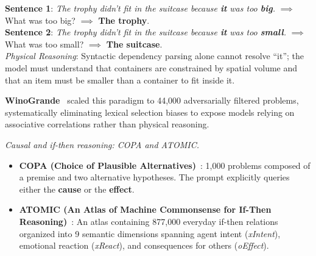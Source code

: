 \documentclass[../../main.tex]{subfiles}
\begin{document}
\begin{center}
\begin{minipage}{0.95\textwidth}
\begin{tcolorbox}[colback=cardBg,colframe=cardLine,arc=2pt,boxrule=0.5pt,title=\textbf{Task Example: Pronoun Coreference Ambiguity (WSC Twin Sentences)}]
\small\sffamily
\textbf{Sentence 1}: \textit{The trophy didn't fit in the suitcase because \textbf{it} was too \textbf{big}.} $\implies$ What was too big? $\implies$ \textbf{The trophy}. \\
\textbf{Sentence 2}: \textit{The trophy didn't fit in the suitcase because \textbf{it} was too \textbf{small}.} $\implies$ What was too small? $\implies$ \textbf{The suitcase}. \\
\textit{Physical Reasoning}: Syntactic dependency parsing alone cannot resolve ``it''; the model must understand that containers are constrained by spatial volume and that an item must be smaller than a container to fit inside it.
\end{tcolorbox}
\end{minipage}
\end{center}

\textbf{WinoGrande}~\cite{sakaguchi2020winogrande} scaled this paradigm to 44,000 adversarially filtered problems, systematically eliminating lexical selection biases to expose models relying on associative correlations rather than physical reasoning.

\textit{Causal and if-then reasoning: COPA and ATOMIC.}
\begin{itemize}
    \item \textbf{COPA (Choice of Plausible Alternatives)}~\cite{roemmele2011copa}: 1,000 problems composed of a premise and two alternative hypotheses. The prompt explicitly queries either the \textbf{cause} or the \textbf{effect}.
    \item \textbf{ATOMIC (An Atlas of Machine Commonsense for If-Then Reasoning)}~\cite{sap2019atomic}: An atlas containing 877,000 everyday if-then relations organized into 9 semantic dimensions spanning agent intent (\textit{xIntent}), emotional reaction (\textit{xReact}), and consequences for others (\textit{oEffect}).
\end{itemize}
\end{document}
